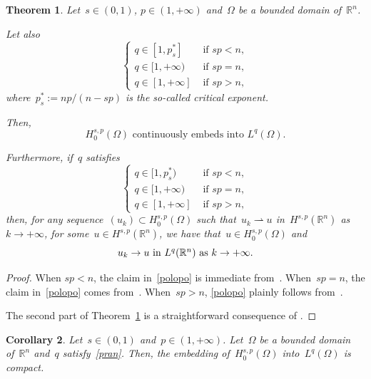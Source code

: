 \documentclass[11pt,hyp,]{nyjm}
\numberwithin{equation}{section}
\newcommand{\R}{\mathbb{R}}
\newtheorem{theorem}{Theorem}[section]
\newtheorem{corollary}[theorem]{Corollary}
\theoremstyle{remark}
\begin{document}
\begin{theorem}\label{qtppd}
Let~$s \in (0,1)$, $p \in (1, +\infty)$ and~$\Omega$ be a bounded domain of~$\R^n$.

Let also
\begin{equation}\label{pranbef}
			\begin{cases}
				q \in [1,p^*_s] & \mbox{ if } sp<n ,\\
				q \in [1,+\infty) & \mbox{ if } sp=n ,\\
				q \in [1,+\infty] & \mbox{ if } sp>n,
			\end{cases}
		\end{equation}
		where~$p^*_s := np / (n-sp)$ is the so-called critical exponent. 
		
Then,
\begin{equation}\label{polopo}
\mbox{$H_0^{s,p}(\Omega)$ continuously embeds into $L^q(\Omega)$.}
\end{equation}
		
Furthermore, if~$q$ satisfies 
		\begin{equation} \label{pran}
			\begin{cases}
				q \in [1,p^*_s) & \mbox{ if } sp<n ,\\
				q \in [1,+\infty) & \mbox{ if } sp=n, \\
				q \in [1,+\infty] & \mbox{ if } sp>n,
			\end{cases}
		\end{equation}
		then, for any sequence~$(u_k) \subset H^{s,p}_0(\Omega)$ such that~$u_k \rightharpoonup u$ in~$H^{s,p}(\R^n)$ as~$k\to+\infty$, for some~$u \in H^{s,p}(\R^n)$, we have that~$u \in H^{s,p}_0(\Omega)$ and 
		\begin{equation}\label{orcio}
		\mbox{$u_k \to u $ in $ L^q(\R^n)$ as~$k\to+\infty$.}
		\end{equation}
		\end{theorem}
		\begin{proof}
	When $sp<n$, the claim in~\eqref{polopo} is immediate from~\cite[Theorem~1.8]{shieh}.
	When~$sp=n$, the claim in~\eqref{polopo} comes from~\cite[Theorem~1.10]{shieh}. When~$sp>n$,
		\eqref{polopo} plainly follows from~\cite[Theorem~2.2, \textit{(e)}]{shieh}.
	
		
		The second part of Theorem~\ref{qtppd} is a straightforward consequence of \cite[Theorem 2.8]{mora}.
		\end{proof}
		\begin{corollary} \label{kas}
			Let~$s \in (0,1)$ and~$p \in (1, +\infty)$. Let~$\Omega$ be a bounded domain of~$\R^n$
			and~$q$ satisfy~\eqref{pran}. 
			Then, the embedding of~$H^{s,p}_0(\Omega)$ into~$L^q(\Omega)$ is compact.
		\end{corollary}
\end{document}
